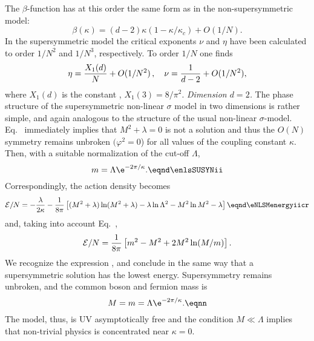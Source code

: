 The $\beta $-function has at this order the same form as in the non-supersymmetric model:
$$\beta (\kappa )=(d-2)\kappa (1-\kappa /\kappa _c)+O(1/N).$$
In the supersymmetric model the critical exponents $\nu$ and $\eta$ have been calculated
to order $1/N^2$ and $1/N^3$, respectively. To order $1/N$ one finds
$$\eta= {X_1(d)\over N}+O(1/N^2)\,, \quad \nu={1\over d-2}+O(1/N^2),$$
where $X_1(d)$ is the constant \eXone, $X_1(3)=8/\pi^2$.
\medskip
{\it Dimension $d=2$.}   The phase structure of the supersymmetric
non-linear $\sigma$ model in two dimensions is rather simple, and again analogous to the structure of the usual non-linear $\sigma $-model.
Eq.~ immediately implies that $M^2+\lambda =0$ is not a solution
and thus the $O(N)$ symmetry remains unbroken $(\varphi^2=0$)
for all values of the coupling constant $\kappa $.
Then, with a suitable normalization of the cut-off $\Lambda $,
$$m=\Lambda \e^{-2\pi/\kappa }. \eqnd\enlsSUSYNii $$
Correspondingly, the action density becomes
$$  {\cal E} /N=   -  {\lambda\over2\kappa}
 -{1\over8\pi}\left[(M^2+\lambda)\ln(M^2+\lambda)
-\lambda\ln  \Lambda ^2
-M^2\ln M^2 -\lambda\right]  \eqnd\eNLSMenergyiicr $$
and, taking into account Eq.~\enlsSUSYNii,
$${\cal E} /N={1\over 8\pi}\left[m^2-M^2+2M^2\ln(M/m)\right].$$
We recognize the expression \eSUSYNEnii, and conclude in the same way
 that a  supersymmetric solution has the lowest energy. Supersymmetry remains unbroken, and the common boson and fermion mass is
$$M=m=\Lambda \e^{-2\pi/\kappa }. \eqnn $$
The model, thus, is UV asymptotically free and the condition $M\ll\Lambda $ implies that non-trivial physics is concentrated
near $\kappa =0$.
